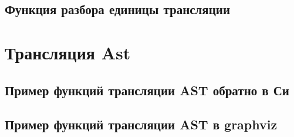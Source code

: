 \section*{Функция разбора единицы трансляции}



\chapter{Трансляция Ast}
\section*{Пример функций трансляции AST обратно в Си}


\section*{Пример функций трансляции AST в graphviz}










